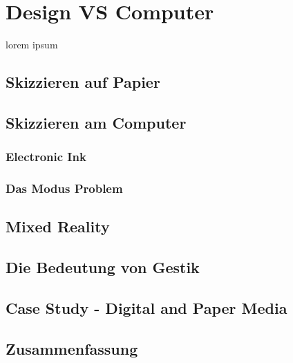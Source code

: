 \chapter{Design VS Computer}\label{ch:DesignVSComputer}

lorem ipsum

\section{Skizzieren auf Papier}

\section{Skizzieren am Computer}

\subsection{Electronic Ink}

\subsection{Das Modus Problem}\label{sec:ModusProblem}

\section{Mixed Reality}

\section{Die Bedeutung von Gestik}

\section{Case Study - Digital and Paper Media}

\section*{Zusammenfassung}